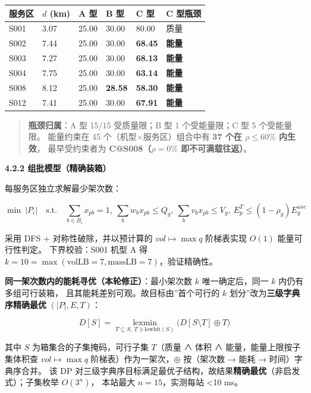 \documentclass[
  10.5pt,
]{article}
\newcounter{none} %
\begin{document}
{\def\LTcaptype{none} %
\begin{longtable}[]{@{}llllll@{}}
\toprule\noalign{}
服务区 & \(d\) (km) & A 型 & B 型 & C 型 & C 型瓶颈 \\
\midrule\noalign{}
\endhead
\bottomrule\noalign{}
\endlastfoot
S001 & 3.07 & 25.00 & 30.00 & 80.00 & 质量 \\
S002 & 7.44 & 25.00 & 30.00 & \textbf{68.45} & \textbf{能量} \\
S003 & 7.27 & 25.00 & 30.00 & \textbf{68.13} & \textbf{能量} \\
S004 & 7.75 & 25.00 & 30.00 & \textbf{63.14} & \textbf{能量} \\
S008 & 8.12 & 25.00 & \textbf{28.58} & \textbf{58.30} & \textbf{能量} \\
S012 & 7.41 & 25.00 & 30.00 & \textbf{67.91} & \textbf{能量} \\
\end{longtable}
}

\begin{quote}
\textbf{瓶颈归属}：A 型 15/15 受质量限；B 型 1 个受能量限；C 型 5
个受能量限。 能量约束在 45 个（机型×服务区）组合中有 \textbf{37 个在
\(\rho\le60\%\) 内生效}， 最早受约束者为 \textbf{C@S008（\(\rho=0\%\)
即不可满载往返）}。
\end{quote}

\textbf{4.2.2 组批模型（精确装箱）}

每服务区独立求解最少架次数：

\[\min\ \lvert P_i\rvert \quad \text{s.t.}\quad
\sum_{b\in B_i}x_{pb}=1,\ \sum_b w_b x_{pb}\le Q_g,\ \sum_b v_b x_{pb}\le V_g,\ E^T_p\le(1-\rho_g)E^{use}_g\]

采用 DFS + 对称性破除，并以预计算的 \(vol\mapsto\max q\) 阶梯表实现
\(O(1)\) 能量可行性判定。 下界校验：S001 机型 A 得
\(k=10=\max(\text{volLB}=7,\text{massLB}=7)\)，验证精确性。

\textbf{同一架次数内的能耗寻优（本轮修正）}：最小架次数 \(k\)
唯一确定后，同一 \(k\) 内仍有多组可行装箱，
且其能耗差别可观。故目标由''首个可行的 \(k\)
划分''改为\textbf{三级字典序精确最优} \((\lvert P\rvert,E,T)\)：

\[D[S]=\operatorname*{lexmin}_{T\subseteq S,\ T\ni \text{lowbit}(S)} \bigl(D[S\setminus T]\oplus T\bigr)\]

其中 \(S\) 为箱集合的子集掩码，可行子集 \(T\)（质量 ∧ 体积 ∧
能量，能量上限按子集体积查 \(vol\mapsto\max q\)
阶梯表）作为一架次，\(\oplus\) 按（架次数 → 能耗 → 时间）字典序合并。 该
DP
对三级字典序目标满足最优子结构，故结果\textbf{精确最优}（非启发式）；子集枚举
\(O(3^n)\)， 本站最大 \(n=15\)，实测每站 \textless10 ms。
\end{document}

